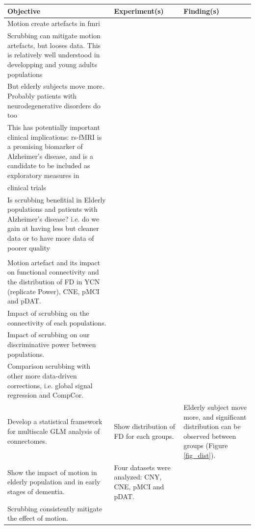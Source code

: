 \documentclass[authoryear]{elsarticle}
\begin{document}
\begin{landscape}

\begin{table}[tbp]
 \begin{center}
  \begin{tabular}{p{6cm}p{6cm}p{10cm}}
   Objective & Experiment(s) & Finding(s)\\
   \hline
   
    Motion create artefacts in fmri\\
    Scrubbing can mitigate motion artefacts, but looses data. This is relatively well understood in developping and young adults populations\\
    But elderly subjects move more. Probably patients with neurodegenerative disorders do too\\
    This has potentially important clinical implications: rs-fMRI is a promising biomarker of Alzheimer's disease, and is a candidate to be included as exploratory measures in\\ clinical trials\\
    Is scrubbing benefitial in Elderly populations and patients with Alzheimer's disease? i.e. do we gain at having less but cleaner data or to have more data of poorer quality\\
 
    \\Motion artefact and its impact on functional connectivity and the distribution of FD in YCN (replicate Power), CNE, pMCI and pDAT.
    \\Impact of scrubbing on the connectivity of each populations.
    \\Impact of scrubbing on our discriminative power between populations.
    \\Comparison scrubbing with other more data-driven corrections, i.e. global signal regression and CompCor.
 
   \\Develop a statistical framework for multiscale GLM analysis of connectomes. & Show distribution of FD for each groups. & Elderly subject move more, and significant distribution can be observed between groups (Figure \ref{fig_dist}).
   
   \\Show the impact of motion in elderly population and in early stages of dementia. & Four datasets were analyzed: CNY, CNE, pMCI and pDAT. 
   
   \\Scrubbing consistently mitigate the effect of motion. & 
   

\end{tabular}
\end{center}
\end{table}
\end{landscape}
\end{document}
